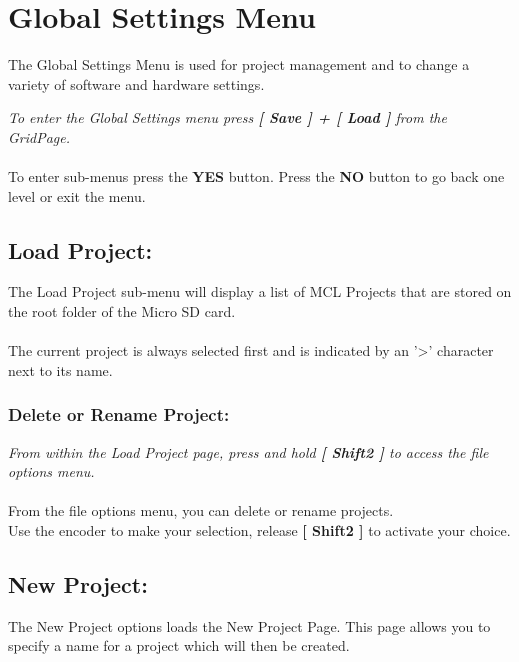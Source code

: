 \chapter{Global Settings Menu}
The Global Settings Menu is used for project management and to change a variety of software and hardware settings.


\textit{To enter the Global Settings menu press \textbf{[ Save ] + [ Load ]} from the GridPage.}\\\\
To enter sub-menus press the \textbf{YES} button. Press the \textbf{NO} button to go back one level or exit the menu.
\section{Load Project:}
The Load Project sub-menu will display a list of MCL Projects that are stored on the root folder of the Micro SD card.\\\\
The current project is always selected first and is indicated by an '>' character next to its name.

\subsection{Delete or Rename Project:}
\textit{From within the Load Project page, press and hold \textbf{[ Shift2 ]} to access the file options menu.}\\\\
From the file options menu, you can delete or rename projects.\\
Use the encoder to make your selection, release \textbf{[ Shift2 ]} to activate your choice.

\newpage
\section{New Project:}
The New Project options loads the New Project Page. This page allows you to specify a name for a project which will then be created.\\

